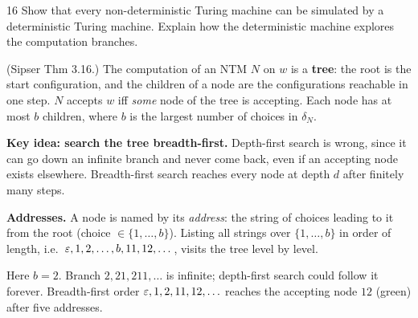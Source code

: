 \begin{question}{16}
Show that every non-deterministic Turing machine can be simulated by a deterministic Turing machine. Explain how the deterministic machine explores the computation branches.
\end{question}
\begin{soln}
(Sipser Thm 3.16.) The computation of an NTM $N$ on $w$ is a \textbf{tree}: the root is the start configuration, and the children of a node are the configurations reachable in one step. $N$ accepts $w$ iff \emph{some} node of the tree is accepting. Each node has at most $b$ children, where $b$ is the largest number of choices in $\delta_N$.

\textbf{Key idea: search the tree breadth-first.} Depth-first search is wrong, since it can go down an infinite branch and never come back, even if an accepting node exists elsewhere. Breadth-first search reaches every node at depth $d$ after finitely many steps.

\textbf{Addresses.} A node is named by its \emph{address}: the string of choices leading to it from the root (choice $\in\{1,\dots,b\}$). Listing all strings over $\{1,\dots,b\}$ in order of length, i.e.\ $\varepsilon,1,2,\dots,b,11,12,\dots$, visits the tree level by level.

\begin{center}

{\footnotesize Here $b=2$. Branch $2,21,211,\dots$ is infinite; depth-first search could follow it forever. Breadth-first order $\varepsilon,1,2,11,12,\ldots$ reaches the accepting node $12$ (green) after five addresses.}
\end{center}


\end{soln}
